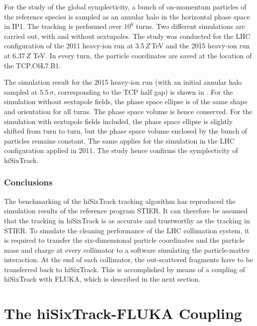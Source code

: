 For the study of the global symplecticity, a bunch of on-momentum particles of the reference species is sampled as an annular halo in the horizontal phase space in IP1. The tracking is performed over $10^6$ turns. Two different simulations are carried out, with and without sextupoles. The study was conducted for the LHC configuration of the 2011 heavy-ion run at 3.5$\,Z\,$TeV and the 2015 heavy-ion run at $6.37\,Z$ TeV. In every turn, the particle coordinates are saved at the location of the TCP.C6L7.B1.

The simulation result for the 2015 heavy-ion run (with an initial annular halo sampled at $5.5\,\sigma$, corresponding to the TCP half gap) is shown in . For the simulation without sextupole fields, the phase space ellipse is of the same shape and orientation for all turns. The phase space volume is hence conserved. For the simulation with sextupole fields included, the phase space ellipse is slightly shifted from turn to turn, but the phase space volume enclosed by the bunch of particles remains constant. The same applies for the simulation in the LHC configuration applied in 2011. The study hence confirms the symplecticity of hiSixTrack.

\subsubsection{Conclusions}

The benchmarking of the hiSixTrack tracking algorithm has reproduced the simulation results of the reference program STIER. It can therefore be assumed that the tracking in hiSixTrack is as accurate and trustworthy as the tracking in STIER. To simulate the cleaning performance of the LHC collimation system, it is required to transfer the six-dimensional particle coordinates and the particle mass and charge at every collimator to a software simulating the particle-matter interaction. At the end of each collimator, the out-scattered fragments have to be transferred back to hiSixTrack. This is accomplished by means of a coupling of hiSixTrack with FLUKA, which is described in the next section.





\newpage

\section{The hiSixTrack-FLUKA Coupling} \label{chap:hisix_coupling}

